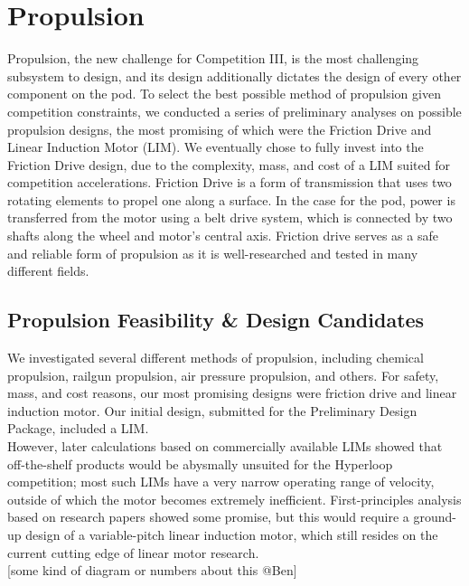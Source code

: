 \documentclass[main.tex]{subfiles}
\begin{document}
    \chapter{Propulsion}
    \label{ch:propulsion}
    Propulsion, the new challenge for Competition III, is the most challenging subsystem to design, and its design additionally dictates the design of every other component on the pod. To select the best possible method of propulsion given competition constraints, we conducted a series of preliminary analyses on possible propulsion designs, the most promising of which were the Friction Drive and Linear Induction Motor (LIM). We eventually chose to fully invest into the Friction Drive design, due to the complexity, mass, and cost of a LIM suited for competition accelerations. Friction Drive is a form of transmission that uses two rotating elements to propel one along a surface. In the case for the pod, power is transferred from the motor using a belt drive system, which is connected by two shafts along the wheel and motor’s central axis. Friction drive serves as a safe and reliable form of propulsion as it is well-researched and tested in many different fields.

    \section{Propulsion Feasibility \& Design Candidates}
    We investigated several different methods of propulsion, including chemical propulsion, railgun propulsion, air pressure propulsion, and others. For safety, mass, and cost reasons, our most promising designs were friction drive and linear induction motor. Our initial design, submitted for the Preliminary Design Package, included a LIM.\\

    However, later calculations based on commercially available LIMs showed that off-the-shelf products would be abysmally unsuited for the Hyperloop competition; most such LIMs have a very narrow operating range of velocity, outside of which the motor becomes extremely inefficient. First-principles analysis based on research papers showed some promise, but this would require a ground-up design of a variable-pitch linear induction motor, which still resides on the current cutting edge of linear motor research.\\

    [some kind of diagram or numbers about this @Ben]\\
\end{document}
